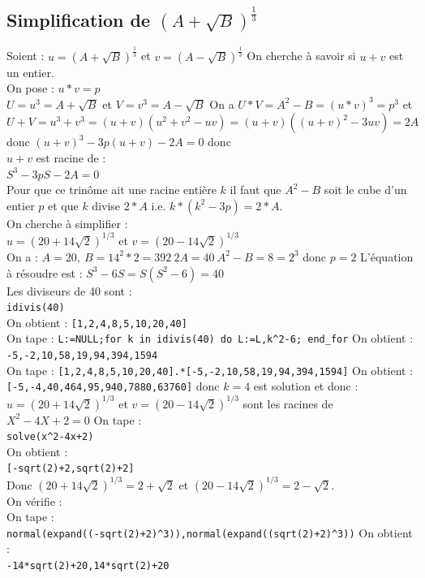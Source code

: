 \documentclass[a4paper,11pt]{book}
\begin{document}
\subsection{Simplification de ${(A+\sqrt B)}^{\frac{1}{3}}$} 
Soient :
$u=(A+\sqrt B)^{\frac{1}{3}}$ et $v=(A-\sqrt B)^{\frac{1}{3}}$
On cherche \`a savoir si $u+v$ est un entier.\\
On pose :
$u*v=p$\\
$U=u^3=A+\sqrt B$ et $V=v^3=A-\sqrt B$
On a $U*V=A^2-B=(u*v)^3=p^3$ et\\
$U+V=u^3+v^3=(u+v)(u^2+v^2-uv)=(u+v)((u+v)^2-3uv)=2A$ donc 
$(u+v)^3-3p(u+v)-2A=0$ donc\\
$u+v$ est racine de :\\
$S^3-3pS-2A=0$\\
Pour que ce trin\^ome ait une racine enti\`ere $k$ il faut que $A^2-B$ soit le
cube d'un entier $p$ et que $k$ divise $2*A$ i.e. $k*(k^2-3p)=2*A$.\\

On cherche \`a simplifier :\\
$u=(20+14\sqrt 2)^{1/3}$ et $v=(20-14\sqrt 2)^{1/3}$\\
On a : $A=20,\ B=14^2*2=392 \ 2A=40 \ A^2-B=8=2^3$ donc $p=2$
L'\'equation \`a r\'esoudre est : $S^3-6S=S(S^2-6)=40$\\
Les diviseurs de 40 sont :\\
{\tt idivis(40)}\\
On obtient :
{\tt [1,2,4,8,5,10,20,40]}\\
On tape :
{\tt L:=NULL;for k in  idivis(40) do L:=L,k\verb|^|2-6; end\_for}
On obtient :\\
{\tt -5,-2,10,58,19,94,394,1594}\\
On tape :
{\tt [1,2,4,8,5,10,20,40].*[-5,-2,10,58,19,94,394,1594]}
On obtient :\\
{\tt [-5,-4,40,464,95,940,7880,63760]}
donc $k=4$ est solution et donc :\\
$u=(20+14\sqrt 2)^{1/3}$ et $v=(20-14\sqrt 2)^{1/3}$ sont les racines de 
$X^2-4X+2=0$
On tape :\\
{\tt solve(x\verb|^|2-4x+2)}\\
On obtient :\\
{\tt [-sqrt(2)+2,sqrt(2)+2]}\\
Donc $(20+14\sqrt 2)^{1/3}=2+\sqrt 2$ et $(20-14\sqrt 2)^{1/3}=2-\sqrt 2$.\\
On v\'erifie :\\
On tape :\\
{\tt normal(expand((-sqrt(2)+2)\verb|^|3)),normal(expand((sqrt(2)+2)\verb|^|3))}
On obtient :\\
{\tt -14*sqrt(2)+20,14*sqrt(2)+20}\\
\end{document}
